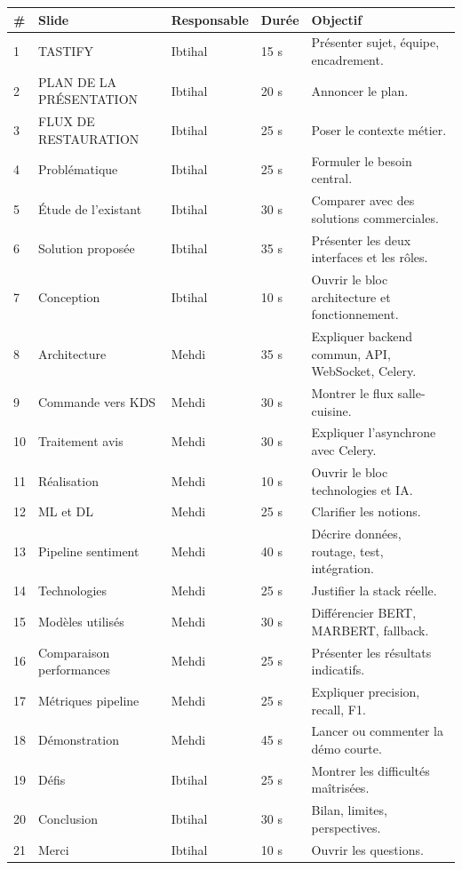\documentclass[11pt,a4paper]{article}
\begin{document}
\begin{longtable}{p{0.8cm}p{5.2cm}p{2.1cm}p{2.2cm}p{4.2cm}}
\toprule
\textbf{\#} & \textbf{Slide} & \textbf{Responsable} & \textbf{Durée} & \textbf{Objectif}\\
\midrule
1 & TASTIFY & Ibtihal & 15 s & Présenter sujet, équipe, encadrement.\\
2 & PLAN DE LA PRÉSENTATION & Ibtihal & 20 s & Annoncer le plan.\\
3 & FLUX DE RESTAURATION & Ibtihal & 25 s & Poser le contexte métier.\\
4 & Problématique & Ibtihal & 25 s & Formuler le besoin central.\\
5 & Étude de l'existant & Ibtihal & 30 s & Comparer avec des solutions commerciales.\\
6 & Solution proposée & Ibtihal & 35 s & Présenter les deux interfaces et les rôles.\\
7 & Conception & Ibtihal & 10 s & Ouvrir le bloc architecture et fonctionnement.\\
8 & Architecture & Mehdi & 35 s & Expliquer backend commun, API, WebSocket, Celery.\\
9 & Commande vers KDS & Mehdi & 30 s & Montrer le flux salle-cuisine.\\
10 & Traitement avis & Mehdi & 30 s & Expliquer l'asynchrone avec Celery.\\
11 & Réalisation & Mehdi & 10 s & Ouvrir le bloc technologies et IA.\\
12 & ML et DL & Mehdi & 25 s & Clarifier les notions.\\
13 & Pipeline sentiment & Mehdi & 40 s & Décrire données, routage, test, intégration.\\
14 & Technologies & Mehdi & 25 s & Justifier la stack réelle.\\
15 & Modèles utilisés & Mehdi & 30 s & Différencier BERT, MARBERT, fallback.\\
16 & Comparaison performances & Mehdi & 25 s & Présenter les résultats indicatifs.\\
17 & Métriques pipeline & Mehdi & 25 s & Expliquer precision, recall, F1.\\
18 & Démonstration & Mehdi & 45 s & Lancer ou commenter la démo courte.\\
19 & Défis & Ibtihal & 25 s & Montrer les difficultés maîtrisées.\\
20 & Conclusion & Ibtihal & 30 s & Bilan, limites, perspectives.\\
21 & Merci & Ibtihal & 10 s & Ouvrir les questions.\\
\bottomrule
\end{longtable}
\end{document}
